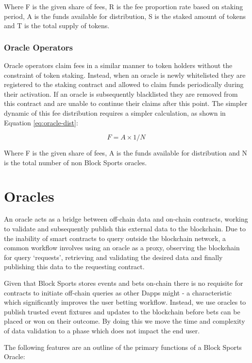 \documentclass{article}
\begin{document}
Where F is the given share of fees, R is the fee proportion rate based on staking period, A is the funds available for distribution, S is the staked amount of tokens and T is the total supply of tokens.

		\subsubsection{Oracle Operators}
Oracle operators claim fees in a similar manner to token holders without the constraint of token staking. Instead, when an oracle is newly whitelisted they are registered to the staking contract and allowed to claim funds periodically during their activation. If an oracle is subsequently blacklisted they are removed from this contract and are unable to continue their claims after this point. The simpler dynamic of this fee distribution requires a simpler calculation, as shown in Equation \ref{eq:oracle-dist}:

\begin{equation}
F = A\times 1/N\label{eq:oracle-dist}
\end{equation}

Where F is the given share of fees, A is the funds available for distribution and N is the total number of non Block Sports oracles.

\section{Oracles}
An oracle acts as a bridge between off-chain data and on-chain contracts, working to validate and subsequently publish this external data to the blockchain. Due to the inability of smart contracts to query outside the blockchain network, a common workflow involves using an oracle as a proxy, observing the blockchain for query ‘requests’, retrieving and validating the desired data and finally publishing this data to the requesting contract.

Given that Block Sports stores events and bets on-chain there is no requisite for contracts to initiate off-chain queries as other Dapps might - a characteristic which significantly improves the user betting workflow. Instead, we use oracles to publish trusted event fixtures and updates to the blockchain before bets can be placed or won on their outcome. By doing this we move the time and complexity of data validation to a phase which does not impact the end user.

The following features are an outline of the primary functions of a Block Sports Oracle:
\end{document}
